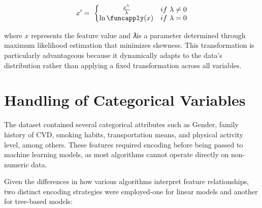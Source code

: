 \begin{equation}
    \centering
    x^\prime=\ \left\{
                   \begin{matrix}
                       \frac{x^\lambda}{\lambda}&if\ \lambda\neq0\\
                       \ln\funcapply(x)&if\ \lambda=0\\
                   \end{matrix}\right.
    \label{eq:eq_box_cox}
\end{equation}

where $x$ represents the feature value and 𝜆is a parameter determined through maximum likelihood estimation that minimizes skewness.
This transformation is particularly advantageous because it dynamically adapts to the data’s distribution rather than applying a fixed transformation across all variables.



\section{Handling of Categorical Variables}\label{sec:handling-of-categorical-variables}

The dataset contained several categorical attributes such as Gender, family history of CVD, smoking habits, transportation means, and physical activity level, among others.
These features required encoding before being passed to machine learning models, as most algorithms cannot operate directly on non-numeric data.

Given the differences in how various algorithms interpret feature relationships, two distinct encoding strategies were employed-one for linear models and another for tree-based models:

